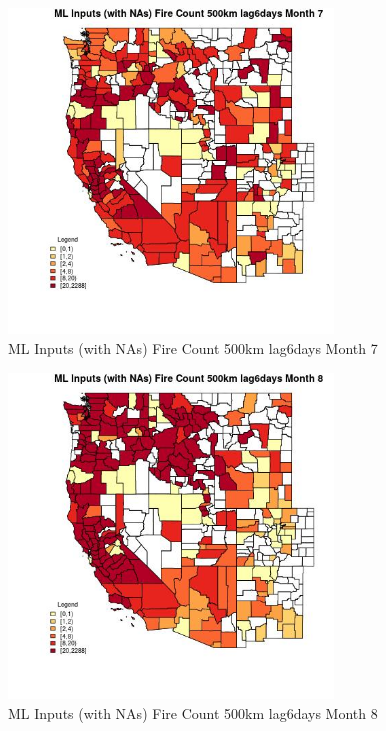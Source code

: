 \clearpage 

\begin{figure} 
\centering  
\includegraphics[width=0.77\textwidth]{Code_Outputs/Report_ML_input_PM25_Step4_part_e_de_duplicated_aves_compiled_2019-05-20wNAs_CountyFire_Count_500km_lag6daysmedianMonth7.jpg} 
\caption{\label{fig:Report_ML_input_PM25_Step4_part_e_de_duplicated_aves_compiled_2019-05-20wNAsCountyFire_Count_500km_lag6daysmedianMonth7}ML Inputs (with NAs) Fire Count 500km lag6days Month 7} 
\end{figure} 
 

\begin{figure} 
\centering  
\includegraphics[width=0.77\textwidth]{Code_Outputs/Report_ML_input_PM25_Step4_part_e_de_duplicated_aves_compiled_2019-05-20wNAs_CountyFire_Count_500km_lag6daysmedianMonth8.jpg} 
\caption{\label{fig:Report_ML_input_PM25_Step4_part_e_de_duplicated_aves_compiled_2019-05-20wNAsCountyFire_Count_500km_lag6daysmedianMonth8}ML Inputs (with NAs) Fire Count 500km lag6days Month 8} 
\end{figure} 
 


